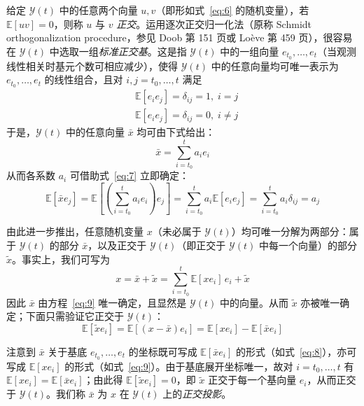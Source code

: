 
给定 $\mathcal{Y}(t)$ 中的任意两个向量 $u, v$（即形如式~\eqref{eq:6} 的随机变量），若 $\mathbb{E}[uv] = 0$，则称 $u$ 与 $v$ \emph{正交}。运用逐次正交归一化法（原称 Schmidt orthogonalization procedure，参见 Doob \cite{r15} 第 151 页或 Loève \cite{r16} 第 459 页），很容易在 $\mathcal{Y}(t)$ 中选取一组\emph{标准正交基}。这是指 $\mathcal{Y}(t)$ 中的一组向量 $e_{t_0}, \dots, e_t$（当观测线性相关时基元个数可相应减少），使得 $\mathcal{Y}(t)$ 中的任意向量均可唯一表示为 $e_{t_0}, \dots, e_t$ 的线性组合，且对 $i, j = t_0, \dots, t$ 满足
\begin{equation}\label{eq:7}
\begin{aligned}
&\mathbb{E}[e_i e_j] = \delta_{ij} = 1,\; i = j \\
&\mathbb{E}[e_i e_j] = \delta_{ij} = 0,\; i \neq j
\end{aligned}
\end{equation}
于是，$\mathcal{Y}(t)$ 中的任意向量 $\bar{x}$ 均可由下式给出：
\begin{equation*}
\bar{x} = \sum_{i=t_0}^{t} a_i e_i
\end{equation*}
从而各系数 $a_i$ 可借助式~\eqref{eq:7} 立即确定：
\begin{equation}\label{eq:8}
\mathbb{E}[\bar{x} e_j] = \mathbb{E}\left[\left(\sum_{i=t_0}^{t} a_i e_i\right) e_j\right] = \sum_{i=t_0}^{t} a_i \mathbb{E}[e_i e_j] = \sum_{i=t_0}^{t} a_i \delta_{ij} = a_j
\end{equation}

由此进一步推出，任意随机变量 $x$（未必属于 $\mathcal{Y}(t)$）均可唯一分解为两部分：属于 $\mathcal{Y}(t)$ 的部分 $\bar{x}$，以及正交于 $\mathcal{Y}(t)$（即正交于 $\mathcal{Y}(t)$ 中每一个向量）的部分 $\tilde{x}$。事实上，我们可写为
\begin{equation}\label{eq:9}
x = \bar{x} + \tilde{x} = \sum_{i=t_0}^{t} \mathbb{E}[x e_i]\, e_i + \tilde{x}
\end{equation}
因此 $\bar{x}$ 由方程~\eqref{eq:9} 唯一确定，且显然是 $\mathcal{Y}(t)$ 中的向量。从而 $\tilde{x}$ 亦被唯一确定；下面只需验证它正交于 $\mathcal{Y}(t)$：
\begin{equation*}
\mathbb{E}[\tilde{x} e_i] = \mathbb{E}[(x - \bar{x}) e_i] = \mathbb{E}[x e_i] - \mathbb{E}[\bar{x} e_i]
\end{equation*}

注意到 $\bar{x}$ 关于基底 $e_{t_0}, \dots, e_t$ 的坐标既可写成 $\mathbb{E}[\bar{x} e_i]$ 的形式（如式~\eqref{eq:8}），亦可写成 $\mathbb{E}[x e_i]$ 的形式（如式~\eqref{eq:9}）。由于基底展开坐标唯一，故对 $i = t_0, \dots, t$ 有 $\mathbb{E}[x e_i] = \mathbb{E}[\bar{x} e_i]$；由此得 $\mathbb{E}[\tilde{x} e_i] = 0$，即 $\tilde{x}$ 正交于每一个基向量 $e_i$，从而正交于 $\mathcal{Y}(t)$。我们称 $\bar{x}$ 为 $x$ 在 $\mathcal{Y}(t)$ 上的\emph{正交投影}。

